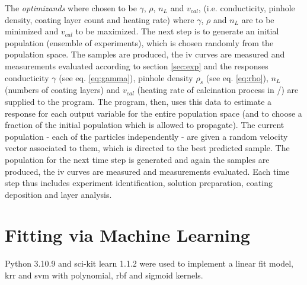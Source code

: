 The \textit{optimizands} where chosen to be $\gamma$, $\rho$, $n_L$ and $v_{cal}$, 
(i.e. conducticity, pinhole density, coating layer count and heating rate)
where $\gamma$, $\rho$ and $n_L$ are to be minimized and $v_{cal}$ to be maximized.
The next step is to generate an initial population (ensemble of experiments), which is chosen randomly from the population space. 
The samples are produced, the \gls{iv} curves are measured and measurements evaluated according to section 
\ref{sec:exp} and the responses conducticity $\gamma$ (see eq. \ref{eq:gamma}), pinhole density $\rho_s$ (see eq. \ref{eq:rho}), 
$n_L$ (numbers of coating layers) and $v_{cal}$ (heating rate of calcination process in 
\oc{}/\minutes{}) are supplied to the program. 
The program, then, uses this data to estimate a response for each output variable 
for the entire population space
(and to choose a fraction of the initial population which is allowed to propagate).
The current population - each of the particles independently - 
are given a random velocity vector associated to them, which is directed to the best predicted sample. 
The population for the next time step is generated and 
again the samples are produced, the \gls{iv} curves are measured and measurements evaluated.
Each time step thus includes experiment identification, solution preparation, coating deposition and layer analysis. 


\section{Fitting via Machine Learning}
Python 3.10.9 and sci-kit learn 1.1.2\cite{pedregosa2011scikit} were used to implement a linear fit model, \gls{krr} and \gls{svm} with polynomial, \gls{rbf} and sigmoid kernels. 

